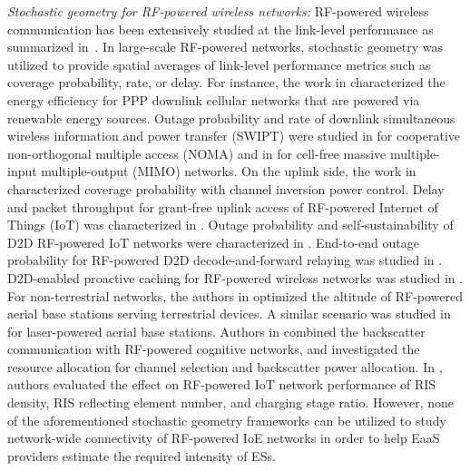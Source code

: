 \indent \textit{Stochastic geometry for
RF-powered wireless networks:} RF-powered wireless communication has been extensively studied at the link-level performance as summarized in~\cite{7010878}. In large-scale RF-powered networks, stochastic geometry was utilized to provide spatial averages of link-level performance metrics such as coverage probability, rate, or delay. For instance, the work in \cite{6786061, 9134826} characterized the energy efficiency for PPP downlink cellular networks that are powered via renewable energy sources. Outage probability and rate of downlink simultaneous wireless information and power transfer (SWIPT) were studied in \cite{9723559} for cooperative non-orthogonal multiple access (NOMA) and in \cite{9201540} for cell-free massive multiple-input multiple-output (MIMO) networks. On the uplink side, the work in \cite{Sakr_EH} characterized coverage probability with channel inversion power control. Delay and packet throughput for grant-free uplink access of RF-powered Internet of Things (IoT) was characterized in \cite{Gharbieh_EH}. Outage probability and self-sustainability of D2D RF-powered IoT networks were characterized in \cite{Fatma_EH, 9093022, 9463400}. End-to-end outage probability for RF-powered D2D decode-and-forward relaying was studied in \cite{8888216}. D2D-enabled proactive caching for RF-powered wireless networks was studied in \cite{8896898}. For non-terrestrial networks, the authors in \cite{9390298} optimized the altitude of RF-powered aerial base stations serving terrestrial devices. A similar scenario was studied in \cite{Kishk1} for laser-powered aerial base stations. Authors in \cite{9507551} combined the backscatter communication with RF-powered cognitive networks, and investigated the resource allocation for channel selection and backscatter power allocation. In \cite{10036459}, authors evaluated the effect on RF-powered IoT network performance of RIS density, RIS reflecting element number, and charging stage ratio. However, none of the aforementioned stochastic geometry frameworks can be utilized to study network-wide connectivity of RF-powered IoE networks in order to help EaaS providers estimate the required intensity of ESs.